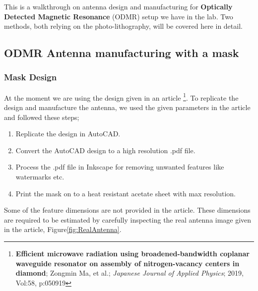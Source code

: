 This is a walkthrough on antenna design and manufacturing for 
\textbf{Optically Detected Magnetic Resonance} (ODMR) setup we have in the lab. 
Two methods, both relying on the photo-lithography, will be covered here in detail.


\subsection{ODMR Antenna manufacturing with a mask}

\subsubsection{Mask Design}

At the moment we are using the design given in an article \footnote{\textbf{Efficient microwave radiation using broadened-bandwidth coplanar waveguide resonator on assembly of nitrogen-vacancy centers in diamond}; Zongmin Ma, 
	et al.; \textit{Japanese Journal of Applied Physics}; 2019, Vol:58, p:050919}. To replicate the design and 
manufacture the antenna, we used the given parameters in the article and followed these steps;

\begin{enumerate}

 \item Replicate the design in AutoCAD.
 \item Convert the AutoCAD design to a high resolution .pdf file.
 \item Process the .pdf file in Inkscape for removing unwanted features like watermarks etc.
 \item Print the mask on to a heat resistant acetate sheet with max resolution.
  
\end{enumerate}

Some of the feature dimensions are not provided in the article. These dimensions are required
to be estimated by carefully inspecting the real antenna image given in the article,
Figure\ref{fig:RealAntenna}.


